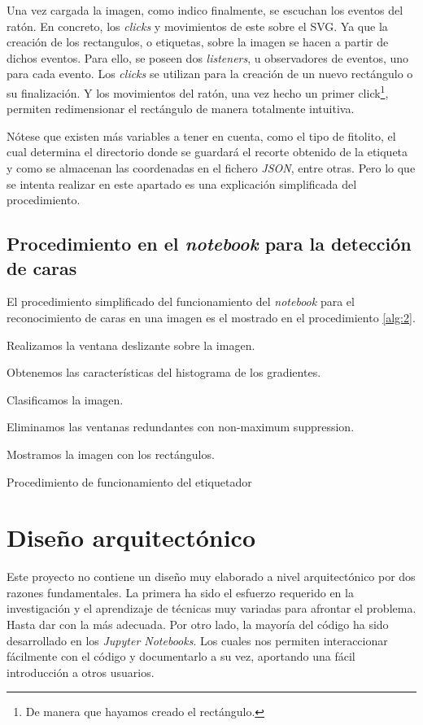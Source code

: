 Una vez cargada la imagen, como indico finalmente, se escuchan los eventos del ratón. En concreto, los \textit{clicks} y movimientos de este sobre el SVG. Ya que la creación de los rectangulos, o etiquetas, sobre la imagen se hacen a partir de dichos eventos. Para ello, se poseen dos \textit{listeners}, u observadores de eventos, uno para cada evento. Los \textit{clicks} se utilizan para la creación de un nuevo rectángulo o su finalización. Y los movimientos del ratón, una vez hecho un primer click\footnote{De manera que hayamos creado el rectángulo.}, permiten redimensionar el rectángulo de manera totalmente intuitiva.

Nótese que existen más variables a tener en cuenta, como el tipo de fitolito, el cual determina el directorio donde se guardará el recorte obtenido de la etiqueta y como se almacenan las coordenadas en el fichero \textit{JSON}, entre otras. Pero lo que se intenta realizar en este apartado es una explicación simplificada del procedimiento.

\subsection{Procedimiento en el \textit{notebook} para la detección de caras}

El procedimiento simplificado del funcionamiento del \textit{notebook} para el reconocimiento de caras en una imagen es el mostrado en el procedimiento \ref{alg:2}.

\begin{algorithm}
    Realizamos la ventana deslizante sobre la imagen.    
    
    Obtenemos las características del histograma de los gradientes.

	Clasificamos la imagen.    
    
    Eliminamos las ventanas redundantes con non-maximum suppression.

    Mostramos la imagen con los rectángulos.
    \caption{Procedimiento de funcionamiento del etiquetador}
    \label{alg:2}
\end{algorithm}

\section{Diseño arquitectónico}

Este proyecto no contiene un diseño muy elaborado a nivel arquitectónico por dos razones fundamentales. La primera ha sido el esfuerzo requerido en la investigación y el aprendizaje de técnicas muy variadas para afrontar el problema. Hasta dar con la más adecuada. Por otro lado, la mayoría del código ha sido desarrollado en los \textit{Jupyter Notebooks}. Los cuales nos permiten interaccionar fácilmente con el código y documentarlo a su vez, aportando una fácil introducción a otros usuarios.

